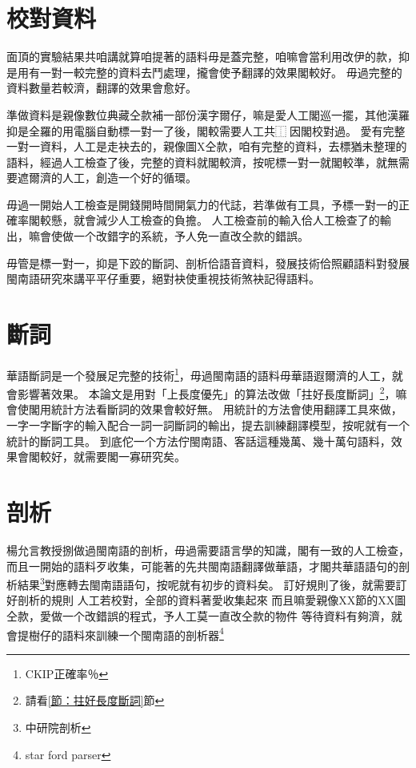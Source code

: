 \documentclass[final,oneside,onecolumn,12pt,a4paper]{book}%
\begin{document}
\section{校對資料}
\label{節：校對資料}
面頂的實驗結果共咱講就算咱提著的語料毋是蓋完整，咱嘛會當利用改伊的款，抑是用有一對一較完整的資料去鬥處理，攏會使予翻譯的效果閣較好。
毋過完整的資料數量若較濟，翻譯的效果會愈好。

準做資料是親像數位典藏仝款補一部份漢字爾仔，嘛是愛人工閣巡一擺，其他漢羅抑是全羅的用電腦自動標一對一了後，閣較需要人工共⿰因閣校對過。
愛有完整一對一資料，人工是走袂去的，親像圖X仝款，咱有完整的資料，去標猶未整理的語料，經過人工檢查了後，完整的資料就閣較濟，按呢標一對一就閣較準，就無需要遮爾濟的人工，創造一个好的循環。

毋過一開始人工檢查是開錢開時間開氣力的代誌，若準做有工具，予標一對一的正確率閣較懸，就會減少人工檢查的負擔。
人工檢查前的輸入佮人工檢查了的輸出，嘛會使做一个改錯字的系統，予人免一直改仝款的錯誤。

毋管是標一對一，抑是下跤的斷詞、剖析佮語音資料，發展技術佮照顧語料對發展閩南語研究來講平平仔重要，絕對袂使重視技術煞袂記得語料。

\section{斷詞}
\label{節：未來斷詞}
華語斷詞是一个發展足完整的技術\footnote{CKIP正確率％}，毋過閩南語的語料毋華語遐爾濟的人工，就會影響著效果。
本論文是用對「上長度優先」的算法改做「拄好長度斷詞」\footnote{請看\ref{節：拄好長度斷詞}節}，嘛會使閣用統計方法看斷詞的效果會較好無。
用統計的方法會使用翻譯工具來做，一字一字斷字的輸入配合一詞一詞斷詞的輸出，提去訓練翻譯模型，按呢就有一个統計的斷詞工具。
到底佗一个方法佇閩南語、客話這種幾萬、幾十萬句語料，效果會閣較好，就需要閣一寡研究矣。
\section{剖析}
\label{節：未來剖析}
楊允言教授捌做過閩南語的剖析，毋過需要語言學的知識，閣有一致的人工檢查，而且一開始的語料歹收集，可能著的先共閩南語翻譯做華語，才閣共華語語句的剖析結果\footnote{中研院剖析}對應轉去閩南語語句，按呢就有初步的資料矣。
訂好規則了後，就需要訂好剖析的規則
人工若校對，全部的資料著愛收集起來
而且嘛愛親像XX節的XX圖仝款，愛做一个改錯誤的程式，予人工莫一直改仝款的物件
等待資料有夠濟，就會提樹仔的語料來訓練一个閩南語的剖析器\footnote{star ford parser}
\end{document}
